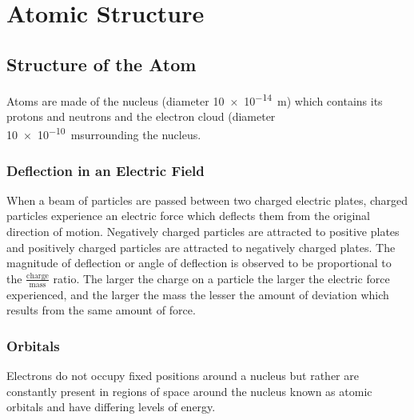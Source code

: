 \documentclass[../main]{subfiles}
\begin{document}
\section{Atomic Structure}

	\subsection{Structure of the Atom}

	Atoms are made of the nucleus (diameter \SI{10e-14}{\m}) which contains its protons and neutrons and the electron cloud  (diameter \SI{10e-10}{\m}surrounding the nucleus.

	\subsubsection{Deflection in an Electric Field}

	When a beam of particles are passed between two charged electric plates, charged particles experience an electric force which deflects them from the original direction of motion. Negatively charged particles are attracted to positive plates and positively charged particles are attracted to negatively charged plates. The magnitude of deflection or angle of deflection is observed to be proportional to the \(\frac{\text{charge}}{\text{mass}}\) ratio. The larger the charge on a particle the larger the electric force experienced, and the larger the mass the lesser the amount of deviation which results from the same amount of force.

	\subsubsection{Orbitals}

	Electrons do not occupy fixed positions around a nucleus but rather are constantly present in regions of space around the nucleus known as atomic orbitals and have differing levels of energy.


\end{document}
